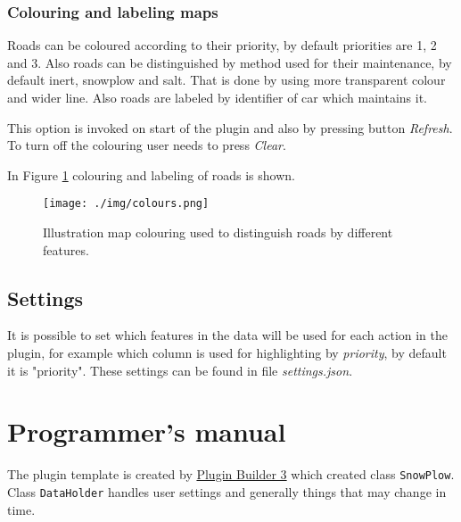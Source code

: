 \documentclass[12pt,a4paper]{article}
\newcommand{\cd}[1]{\texttt{#1}}
\begin{document}
\subsubsection{Colouring and labeling maps}
Roads can be coloured according to their priority, by default priorities are 1, 2 and 3. 
Also roads can be distinguished by method used for their maintenance, by default inert, snowplow and salt. 
That is done by using more transparent colour and wider line.
Also roads are labeled by identifier of car which maintains it.

\par This option is invoked on start of the plugin and also by pressing button \emph{Refresh}.
To turn off the colouring user needs to press \emph{Clear}.

\par In Figure \ref{colours} colouring and labeling of roads is shown.

\begin{figure}[H]\centering
\texttt{[image: ./img/colours.png]}
\caption{Illustration map colouring used to distinguish roads by different features.}
\label{colours}
\end{figure}

\subsection{Settings}
It is possible to set which features in the data will be used for each action in the plugin, for example which column is used for highlighting by \emph{priority}, by default it is "priority".
These settings can be found in file \emph{settings.json}.

\pagebreak

\section{Programmer's manual}
The plugin template is created by \href{http://g-sherman.github.io/Qgis-Plugin-Builder/}{Plugin Builder 3} which created class \cd{SnowPlow}.
Class \cd{DataHolder} handles user settings and generally things that may change in time.
\end{document}
